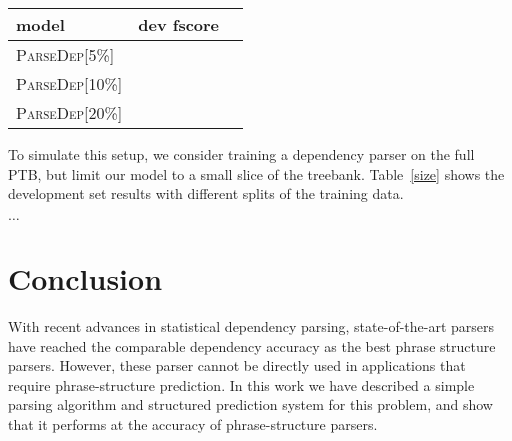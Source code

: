 \documentclass[11pt,letterpaper]{article}
\begin{document}
\begin{table}
  \centering
  \begin{tabular}{|l|ll|}

    \hline
    model & dev fscore & \\
    \hline

    \hline
    \textsc{ParseDep[5\%]}  & & \\
    \textsc{ParseDep[10\%]}  & & \\
    \textsc{ParseDep[20\%]}  & & \\
    \hline

  \end{tabular}
  \caption{}
  \label{tab:size}
\end{table}


To simulate this setup, we consider training a dependency parser on the full PTB, but limit our model to a small slice of the treebank. Table~\ref{size} shows the development set results with different splits of the training data.

$\ldots$

\begin{table}
  \centering

  \label{tab:speed}
  \caption{Experiments of parsing speed. (a) The speed of the parser on its own and with pruning. (b) The end-to-end speed of the parser when combined with different dependency parsers. }
\end{table}




\section{Conclusion}

With recent advances in statistical dependency parsing, state-of-the-art parsers
have reached the comparable  dependency accuracy as the best phrase structure parsers. However,
these parser cannot be directly used in applications that require phrase-structure prediction. In this work
we have described a simple parsing algorithm and structured prediction system for this problem, and show that it
performs at the accuracy of phrase-structure parsers.
\end{document}
